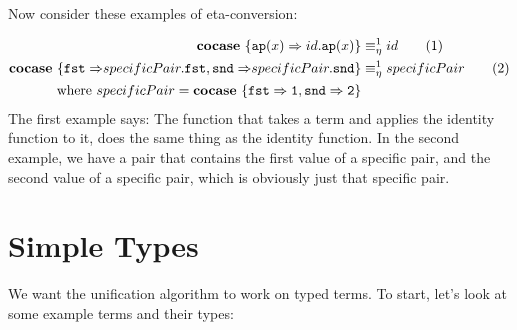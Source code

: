\documentclass[twoside,12pt,a4paper]{article}
\begin{document}
Now consider these examples of eta-conversion:
\begin{example}
    \begin{align*}
        \textbf{cocase}\ \{\texttt{ap}(x)\Rightarrow id.\texttt{ap}(x)\}&\equiv_{\eta}^1 id\tag{1}\\
        \textbf{cocase}\ \{\mathtt{fst\Rightarrow} specificPair.\mathtt{fst}, \mathtt{snd\Rightarrow}specificPair.\mathtt{snd}\}&\equiv_{\eta}^1 specificPair \tag{2}\\      
        \text{where } specificPair = \textbf{cocase}\ \{\mathtt{fst\Rightarrow 1, snd\Rightarrow 2}\}
    \end{align*} %
    The first example says: The function that takes a term and applies the identity function to it, does the same thing as the identity function.
    In the second example, we have a pair that contains the first value of a specific pair, and the second value of a specific pair, which is obviously just that specific pair.    
\end{example}    
    
\section{Simple Types}\label{sec:Simple Types}

We want the unification algorithm to work on typed terms. 
To start, let's look at some example terms and their types:
\end{document}
